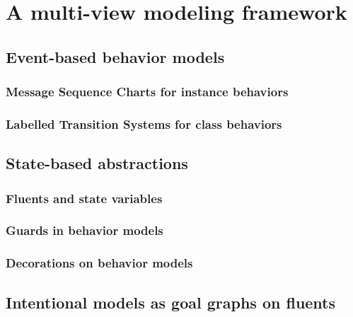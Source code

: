 \chapter{A multi-view modeling framework}
\label{chap:framework}

\section{Event-based behavior models}
\subsection{Message Sequence Charts for instance behaviors}
\subsection{Labelled Transition Systems for class behaviors}

\section{State-based abstractions}
\subsection{Fluents and state variables}
\subsection{Guards in behavior models}
\subsection{Decorations on behavior models}

\section{Intentional models as goal graphs on fluents}

